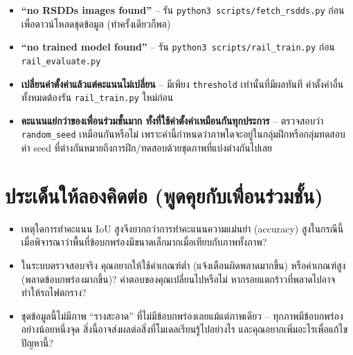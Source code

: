 \documentclass[11pt]{article}
\begin{document}
\begin{warnbox}
\begin{itemize}
  \item \textbf{``no RSDDs images found''} -- รัน \texttt{python3 scripts/fetch\_rsdds.py} ก่อน เพื่อดาวน์โหลดชุดข้อมูล (ทำครั้งเดียวก็พอ)
  \item \textbf{``no trained model found''} -- รัน \texttt{python3 scripts/rail\_train.py} ก่อน \texttt{rail\_evaluate.py}
  \item \textbf{เปลี่ยนค่าตั้งค่าแล้วแต่คะแนนไม่เปลี่ยน} -- มีเพียง \texttt{threshold} เท่านั้นที่มีผลทันที ค่าตั้งค่าอื่นทั้งหมดต้องรัน \texttt{rail\_train.py} ใหม่ก่อน
  \item \textbf{คะแนนแย่กว่าของเพื่อนร่วมชั้นมาก ทั้งที่ใช้ค่าตั้งค่าเหมือนกันทุกประการ} -- ตรวจสอบว่า \texttt{random\_seed} เหมือนกันหรือไม่ เพราะค่านี้กำหนดว่าภาพใดจะอยู่ในกลุ่มฝึกหรือกลุ่มทดสอบ ค่า seed ที่ต่างกันหมายถึงการฝึก/ทดสอบด้วยชุดภาพที่แบ่งต่างกันไปเลย
\end{itemize}
\end{warnbox}

\section*{ประเด็นให้ลองคิดต่อ (พูดคุยกับเพื่อนร่วมชั้น)}
\begin{itemize}
  \item เหตุใดการทำคะแนน IoU สูงจึงยากกว่าการทำคะแนนความแม่นยำ (accuracy) สูงในกรณีนี้ เมื่อพิจารณาว่าพื้นที่ข้อบกพร่องมีขนาดเล็กมากเมื่อเทียบกับภาพทั้งภาพ?
  \item ในระบบตรวจสอบจริง คุณอยากให้ใช้ค่าเกณฑ์ต่ำ (แจ้งเตือนผิดพลาดมากขึ้น) หรือค่าเกณฑ์สูง (พลาดข้อบกพร่องมากขึ้น)? คำตอบของคุณเปลี่ยนไปหรือไม่ หากรอยแตกร้าวที่พลาดไปอาจทำให้รถไฟตกราง?
  \item ชุดข้อมูลนี้ไม่มีภาพ ``รางสะอาด'' ที่ไม่มีข้อบกพร่องเลยแม้แต่ภาพเดียว -- ทุกภาพมีข้อบกพร่องอย่างน้อยหนึ่งจุด สิ่งนี้อาจส่งผลต่อสิ่งที่โมเดลเรียนรู้ไปอย่างไร และคุณอยากเพิ่มอะไรเพื่อแก้ไขปัญหานี้?
\end{itemize}
\end{document}
